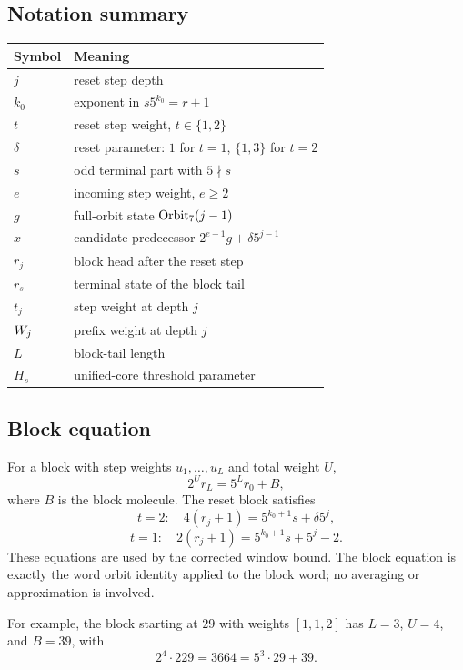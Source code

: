 \subsection{Notation summary}

\begin{center}
\small
\begin{tabular}{@{}p{}p{}@{}}
\toprule
Symbol & Meaning \\
\midrule
$j$ & reset step depth \\
$k_0$ & exponent in $s5^{k_0}=r+1$ \\
$t$ & reset step weight, $t\in\{1,2\}$ \\
$\delta$ & reset parameter: $1$ for $t=1$, $\{1,3\}$ for $t=2$ \\
$s$ & odd terminal part with $5\nmid s$ \\
$e$ & incoming step weight, $e\ge2$ \\
$g$ & full-orbit state $\mathrm{Orbit}_7(j-1)$ \\
$x$ & candidate predecessor $2^{e-1}g+\delta5^{j-1}$ \\
$r_j$ & block head after the reset step \\
$r_s$ & terminal state of the block tail \\
$t_j$ & step weight at depth $j$ \\
$W_j$ & prefix weight at depth $j$ \\
$L$ & block-tail length \\
$H_s$ & unified-core threshold parameter \\
\bottomrule
\end{tabular}
\end{center}

\subsection{Block equation}

For a block with step weights $u_1,\dots,u_L$ and total weight $U$,
\begin{equation*}
  2^U r_L=5^L r_0+B,
\end{equation*}
where $B$ is the block molecule.  The reset block satisfies
\begin{equation*}
  t=2:\quad 4(r_j+1)=5^{k_0+1}s+\delta5^j,
\end{equation*}
\begin{equation*}
  t=1:\quad 2(r_j+1)=5^{k_0+1}s+5^j-2.
\end{equation*}
These equations are used by the corrected window bound.  The block
equation is exactly the word orbit identity applied to the block word;
no averaging or approximation is involved.

For example, the block starting at $29$ with weights $[1,1,2]$ has
$L=3$, $U=4$, and $B=39$, with
\begin{equation*}
  2^4\cdot229=3664=5^3\cdot29+39.
\end{equation*}
